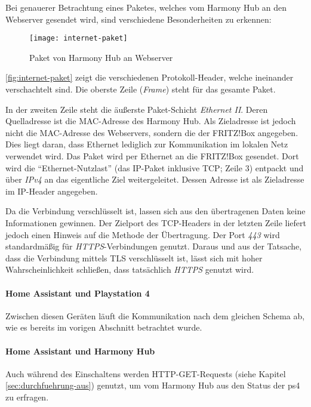 Bei genauerer Betrachtung eines Paketes, welches vom Harmony Hub an den Webserver gesendet wird,
sind verschiedene Besonderheiten zu erkennen:

\begin{figure}[h!]
    \centering
    \texttt{[image: internet-paket]}
    \caption{Paket von Harmony Hub an Webserver}\label{fig:internet-paket}
\end{figure}


\autoref{fig:internet-paket} zeigt die verschiedenen Protokoll-Header, welche ineinander verschachtelt sind.
Die oberste Zeile (\textit{Frame}) steht für das gesamte Paket.

In der zweiten Zeile steht die äußerste Paket-Schicht \textit{Ethernet II}.
Deren Quelladresse ist die MAC-Adresse des Harmony Hub.
Als Zieladresse ist jedoch nicht die MAC-Adresse des Webservers,
sondern die der FRITZ!Box angegeben.
Dies liegt daran, dass Ethernet lediglich zur Kommunikation im lokalen Netz verwendet wird.
Das Paket wird per Ethernet an die FRITZ!Box gesendet.
Dort wird die \enquote{Ethernet-Nutzlast} (das IP-Paket inklusive TCP; Zeile 3) entpackt und über \textit{IPv4} an das eigentliche Ziel weitergeleitet.
Dessen Adresse ist als Zieladresse im IP-Header angegeben.

Da die Verbindung verschlüsselt ist, lassen sich aus den übertragenen Daten keine Informationen gewinnen.
Der Zielport des TCP-Headers in der letzten Zeile liefert jedoch einen Hinweis auf die Methode der Übertragung.
Der Port \textit{443} wird standardmäßig für \textit{HTTPS}-Verbindungen genutzt.
Daraus und aus der Tatsache, dass die Verbindung mittels TLS verschlüsselt ist,
lässt sich mit hoher Wahrscheinlichkeit schließen, dass tatsächlich \textit{HTTPS} genutzt wird.

\paragraph{Home Assistant und Playstation 4}
Zwischen diesen Geräten läuft die Kommunikation nach dem gleichen Schema ab,
wie es bereits im vorigen Abschnitt betrachtet wurde.

\paragraph{Home Assistant und Harmony Hub}
Auch während des Einschaltens werden HTTP-GET-Requests (siehe Kapitel \ref{sec:durchfuehrung-aus}) genutzt,
um vom Harmony Hub aus den Status der \ac{ps4} zu erfragen.

